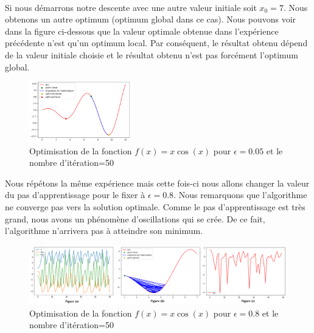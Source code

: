 \documentclass{report}
\begin{document}
\begin{enumerate}
\paragraph{}
Si nous démarrons notre descente avec une autre valeur initiale soit $ x_{0}=7 $. Nous obtenons un autre optimum (optimum global dans ce cas). Nous pouvons voir dans la figure ci-dessous que la valeur optimale obtenue dans l'expérience précédente n'est qu'un optimum local. Par conséquent, le résultat obtenu dépend de la valeur initiale choisie et le résultat obtenu n'est pas forcément l'optimum global.
 \begin{figure}[H]
	\begin{center}
		\includegraphics[width=0.4\textwidth]{f1_glob_loc.png}
		\caption{Optimisation de la fonction $f(x)= x\cos(x)$ pour $\epsilon=0.05$ et le nombre d'itération=50}
	\end{center}
\end{figure}
Nous répétons la même expérience mais cette fois-ci nous allons changer la valeur du pas d'apprentissage pour le fixer à $ \epsilon=0.8$. Nous remarquons que l'algorithme ne converge pas vers la solution optimale. Comme le pas d'apprentissage est très grand, nous avons un phénomène d'oscillations qui se crée. De ce fait, l'algorithme n'arrivera pas à atteindre son minimum. 
 \begin{figure}[H]
	\begin{center}
		\includegraphics[width=1\textwidth]{f1_epgrand.png}
		\caption{Optimisation de la fonction $f(x)= x\cos(x)$ pour $\epsilon=0.8$ et le nombre d'itération=50}
	\end{center}
\end{figure}

\end{enumerate}
\end{document}
